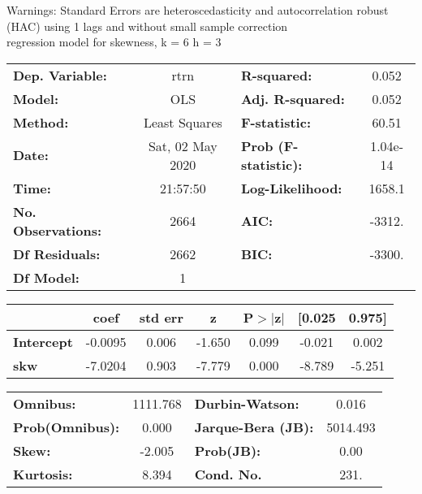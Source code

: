 Warnings: \newline
 [1] Standard Errors are heteroscedasticity and autocorrelation robust (HAC) using 1 lags and without small sample correction\\ 

regression model for skewness, k = 6 h = 3\begin{center}
\begin{tabular}{lclc}
\toprule
\textbf{Dep. Variable:}    &       rtrn       & \textbf{  R-squared:         } &     0.052   \\
\textbf{Model:}            &       OLS        & \textbf{  Adj. R-squared:    } &     0.052   \\
\textbf{Method:}           &  Least Squares   & \textbf{  F-statistic:       } &     60.51   \\
\textbf{Date:}             & Sat, 02 May 2020 & \textbf{  Prob (F-statistic):} &  1.04e-14   \\
\textbf{Time:}             &     21:57:50     & \textbf{  Log-Likelihood:    } &    1658.1   \\
\textbf{No. Observations:} &        2664      & \textbf{  AIC:               } &    -3312.   \\
\textbf{Df Residuals:}     &        2662      & \textbf{  BIC:               } &    -3300.   \\
\textbf{Df Model:}         &           1      & \textbf{                     } &             \\
\bottomrule
\end{tabular}
\begin{tabular}{lcccccc}
                   & \textbf{coef} & \textbf{std err} & \textbf{z} & \textbf{P$> |$z$|$} & \textbf{[0.025} & \textbf{0.975]}  \\
\midrule
\textbf{Intercept} &      -0.0095  &        0.006     &    -1.650  &         0.099        &       -0.021    &        0.002     \\
\textbf{skw}       &      -7.0204  &        0.903     &    -7.779  &         0.000        &       -8.789    &       -5.251     \\
\bottomrule
\end{tabular}
\begin{tabular}{lclc}
\textbf{Omnibus:}       & 1111.768 & \textbf{  Durbin-Watson:     } &    0.016  \\
\textbf{Prob(Omnibus):} &   0.000  & \textbf{  Jarque-Bera (JB):  } & 5014.493  \\
\textbf{Skew:}          &  -2.005  & \textbf{  Prob(JB):          } &     0.00  \\
\textbf{Kurtosis:}      &   8.394  & \textbf{  Cond. No.          } &     231.  \\
\bottomrule
\end{tabular}
\end{center}

